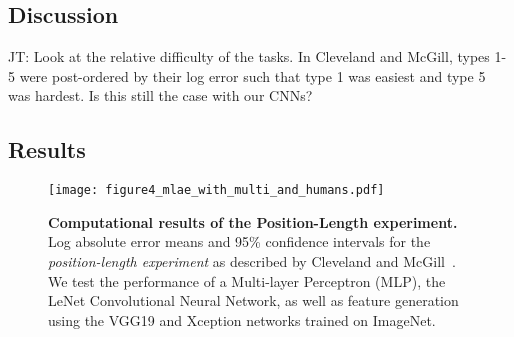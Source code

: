 \subsection{Discussion}

JT: Look at the relative difficulty of the tasks. In Cleveland and McGill, types 1-5 were post-ordered by their log error such that type 1 was easiest and type 5 was hardest. Is this still the case with our CNNs?

\subsection{Results}


\begin{figure}[t]
	  \texttt{[image: figure4\_mlae\_with\_multi\_and\_humans.pdf]}
  \caption{\textbf{Computational results of the Position-Length experiment.} Log absolute error means and 95\% confidence intervals for the \emph{position-length experiment} as described by Cleveland and McGill~\cite{cleveland_mcgill}. We test the performance of a Multi-layer Perceptron (MLP), the LeNet Convolutional Neural Network, as well as feature generation using the VGG19 and Xception networks trained on ImageNet.}
	\label{fig:figure4_mlae}
\end{figure}
